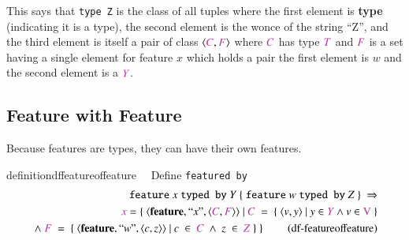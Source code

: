\pn This says that \texttt{type Z} is the class of all tuples where the first element is \textbf{type} (indicating it is a type), the second element is the wonce of the string ``Z'', and the third element is itself a pair of class $\langle \mc{C},\mc{F}\rangle$ where $\mc{C}$ has type $\mc{T}$ and $\mc{F}$ is a set having a single element for feature $x$ which holds a pair 
the first element is $w$ and the second element is a $\mc{Y}$.


\subsection{Feature with Feature}

\pn Because features are types, they can have their own features.

\begin{restatable}{definition}{dffeatureoffeature}~~   Define \texttt{featured by}
\begin{align}
\texttt{feature}~x~\texttt{typed by}~ Y ~\{~\texttt{feature}~w~\texttt{typed by}~ Z~\}~\Rightarrow  \notag \\
\mc{x}=\{~\langle \textbf{feature},``x",\langle \mc{C},\mc{F}\rangle\rangle~\vert~\mc{C}~=~\{~\langle v,y\rangle~\vert~y \in \mc{Y} \wedge v \in \mc{\mathrm{V}}~\} \notag \\
~\wedge~\mc{F}~=~\{~\langle\textbf{feature},``w",\langle c,z\rangle\rangle~\vert~c~\in~\mc{C}~\wedge~z~\in~\mc{Z}~\}~\}~\label{eq:df-featureoffeature}\tag{df-featureoffeature}
\end{align}
\end{restatable}

